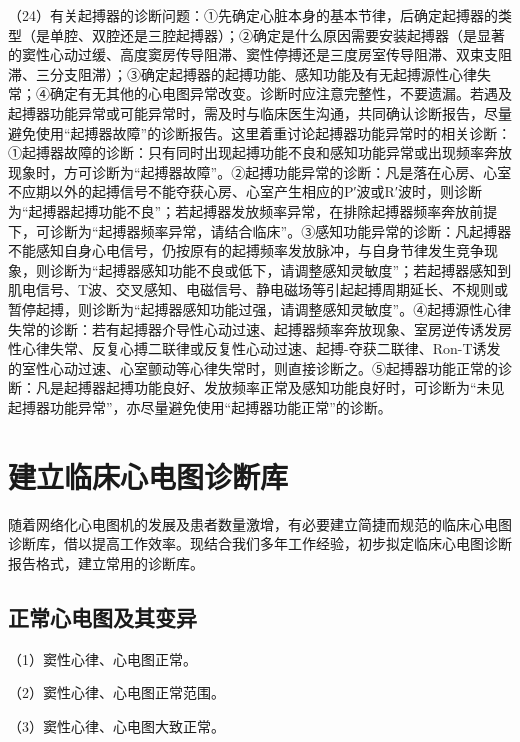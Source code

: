 （24）有关起搏器的诊断问题：①先确定心脏本身的基本节律，后确定起搏器的类型（是单腔、双腔还是三腔起搏器）；②确定是什么原因需要安装起搏器（是显著的窦性心动过缓、高度窦房传导阻滞、窦性停搏还是三度房室传导阻滞、双束支阻滞、三分支阻滞）；③确定起搏器的起搏功能、感知功能及有无起搏源性心律失常；④确定有无其他的心电图异常改变。诊断时应注意完整性，不要遗漏。若遇及起搏器功能异常或可能异常时，需及时与临床医生沟通，共同确认诊断报告，尽量避免使用“起搏器故障”的诊断报告。这里着重讨论起搏器功能异常时的相关诊断：①起搏器故障的诊断：只有同时出现起搏功能不良和感知功能异常或出现频率奔放现象时，方可诊断为“起搏器故障”。②起搏功能异常的诊断：凡是落在心房、心室不应期以外的起搏信号不能夺获心房、心室产生相应的P′波或R′波时，则诊断为“起搏器起搏功能不良”；若起搏器发放频率异常，在排除起搏器频率奔放前提下，可诊断为“起搏器频率异常，请结合临床”。③感知功能异常的诊断：凡起搏器不能感知自身心电信号，仍按原有的起搏频率发放脉冲，与自身节律发生竞争现象，则诊断为“起搏器感知功能不良或低下，请调整感知灵敏度”；若起搏器感知到肌电信号、T波、交叉感知、电磁信号、静电磁场等引起起搏周期延长、不规则或暂停起搏，则诊断为“起搏器感知功能过强，请调整感知灵敏度”。④起搏源性心律失常的诊断：若有起搏器介导性心动过速、起搏器频率奔放现象、室房逆传诱发房性心律失常、反复心搏二联律或反复性心动过速、起搏-夺获二联律、Ron-T诱发的室性心动过速、心室颤动等心律失常时，则直接诊断之。⑤起搏器功能正常的诊断：凡是起搏器起搏功能良好、发放频率正常及感知功能良好时，可诊断为“未见起搏器功能异常”，亦尽量避免使用“起搏器功能正常”的诊断。

\protect\hypertarget{text00057.htmlux5cux23subid679}{}{}

\section{建立临床心电图诊断库}

随着网络化心电图机的发展及患者数量激增，有必要建立简捷而规范的临床心电图诊断库，借以提高工作效率。现结合我们多年工作经验，初步拟定临床心电图诊断报告格式，建立常用的诊断库。

\protect\hypertarget{text00057.htmlux5cux23subid680}{}{}

\subsection{正常心电图及其变异}

（1）窦性心律、心电图正常。

（2）窦性心律、心电图正常范围。

（3）窦性心律、心电图大致正常。

